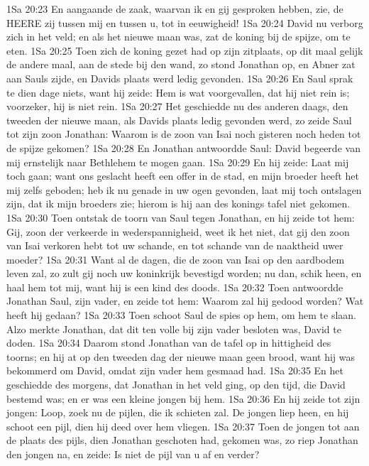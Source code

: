 1Sa 20:23  En aangaande de zaak, waarvan ik en gij gesproken hebben, zie, de HEERE zij tussen mij en tussen u, tot in eeuwigheid!
1Sa 20:24  David nu verborg zich in het veld; en als het nieuwe maan was, zat de koning bij de spijze, om te eten.
1Sa 20:25  Toen zich de koning gezet had op zijn zitplaats, op dit maal gelijk de andere maal, aan de stede bij den wand, zo stond Jonathan op, en Abner zat aan Sauls zijde, en Davids plaats werd ledig gevonden.
1Sa 20:26  En Saul sprak te dien dage niets, want hij zeide: Hem is wat voorgevallen, dat hij niet rein is; voorzeker, hij is niet rein.
1Sa 20:27  Het geschiedde nu des anderen daags, den tweeden der nieuwe maan, als Davids plaats ledig gevonden werd, zo zeide Saul tot zijn zoon Jonathan: Waarom is de zoon van Isai noch gisteren noch heden tot de spijze gekomen?
1Sa 20:28  En Jonathan antwoordde Saul: David begeerde van mij ernstelijk naar Bethlehem te mogen gaan.
1Sa 20:29  En hij zeide: Laat mij toch gaan; want ons geslacht heeft een offer in de stad, en mijn broeder heeft het mij zelfs geboden; heb ik nu genade in uw ogen gevonden, laat mij toch ontslagen zijn, dat ik mijn broeders zie; hierom is hij aan des konings tafel niet gekomen.
1Sa 20:30  Toen ontstak de toorn van Saul tegen Jonathan, en hij zeide tot hem: Gij, zoon der verkeerde in wederspannigheid, weet ik het niet, dat gij den zoon van Isai verkoren hebt tot uw schande, en tot schande van de naaktheid uwer moeder?
1Sa 20:31  Want al de dagen, die de zoon van Isai op den aardbodem leven zal, zo zult gij noch uw koninkrijk bevestigd worden; nu dan, schik heen, en haal hem tot mij, want hij is een kind des doods.
1Sa 20:32  Toen antwoordde Jonathan Saul, zijn vader, en zeide tot hem: Waarom zal hij gedood worden? Wat heeft hij gedaan?
1Sa 20:33  Toen schoot Saul de spies op hem, om hem te slaan. Alzo merkte Jonathan, dat dit ten volle bij zijn vader besloten was, David te doden.
1Sa 20:34  Daarom stond Jonathan van de tafel op in hittigheid des toorns; en hij at op den tweeden dag der nieuwe maan geen brood, want hij was bekommerd om David, omdat zijn vader hem gesmaad had.
1Sa 20:35  En het geschiedde des morgens, dat Jonathan in het veld ging, op den tijd, die David bestemd was; en er was een kleine jongen bij hem.
1Sa 20:36  En hij zeide tot zijn jongen: Loop, zoek nu de pijlen, die ik schieten zal. De jongen liep heen, en hij schoot een pijl, dien hij deed over hem vliegen.
1Sa 20:37  Toen de jongen tot aan de plaats des pijls, dien Jonathan geschoten had, gekomen was, zo riep Jonathan den jongen na, en zeide: Is niet de pijl van u af en verder?
